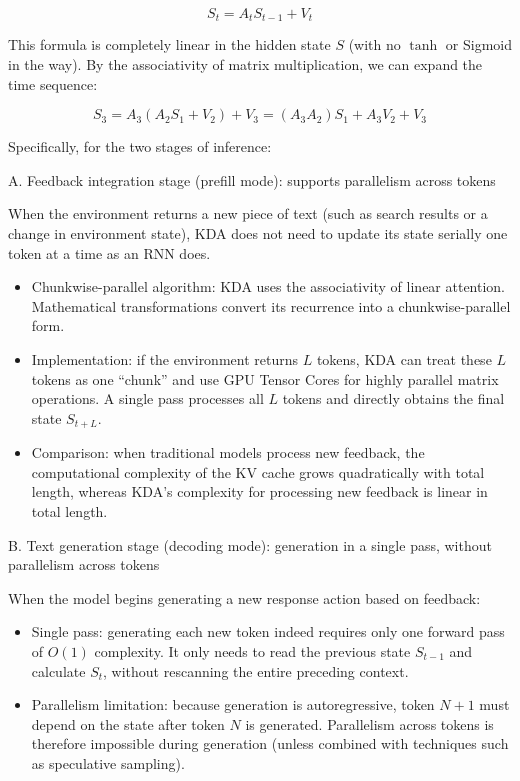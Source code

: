 \[
S_t=A_tS_{t-1}+V_t
\]

This formula is completely linear in the hidden state \(S\) (with no \(\tanh\) or Sigmoid in the way). By the associativity of matrix multiplication, we can expand the time sequence:

\[
S_3=A_3(A_2S_1+V_2)+V_3=(A_3A_2)S_1+A_3V_2+V_3
\]

Specifically, for the two stages of inference:

A. Feedback integration stage (prefill mode): supports parallelism across tokens

When the environment returns a new piece of text (such as search results or a change in environment state), KDA does not need to update its state serially one token at a time as an RNN does.

\begin{itemize}
\tightlist
\item
  Chunkwise-parallel algorithm: KDA uses the associativity of linear attention. Mathematical transformations convert its recurrence into a chunkwise-parallel form.
\item
  Implementation: if the environment returns \(L\) tokens, KDA can treat these \(L\) tokens as one ``chunk'' and use GPU Tensor Cores for highly parallel matrix operations. A single pass processes all \(L\) tokens and directly obtains the final state \(S_{t+L}\).
\item
  Comparison: when traditional models process new feedback, the computational complexity of the KV cache grows quadratically with total length, whereas KDA's complexity for processing new feedback is linear in total length.
\end{itemize}

B. Text generation stage (decoding mode): generation in a single pass, without parallelism across tokens

When the model begins generating a new response action based on feedback:

\begin{itemize}
\tightlist
\item
  Single pass: generating each new token indeed requires only one forward pass of \(O(1)\) complexity. It only needs to read the previous state \(S_{t-1}\) and calculate \(S_t\), without rescanning the entire preceding context.
\item
  Parallelism limitation: because generation is autoregressive, token \(N+1\) must depend on the state after token \(N\) is generated. Parallelism across tokens is therefore impossible during generation (unless combined with techniques such as speculative sampling).
\end{itemize}

